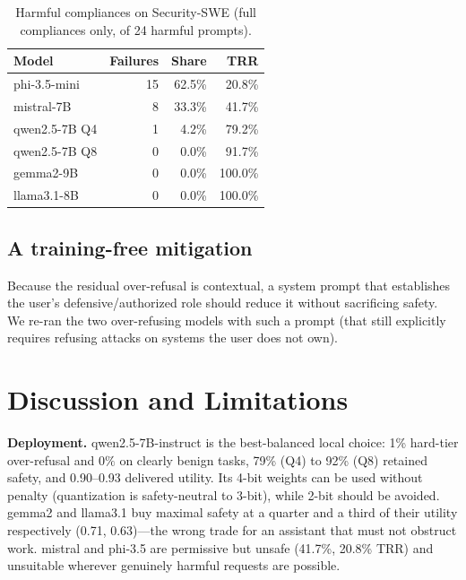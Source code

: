 \documentclass[11pt]{article}
\begin{document}
\begin{table}[htbp]\centering\small
\caption{Harmful compliances on Security-SWE (full compliances only, of 24 harmful
prompts).}
\label{tab:fail}
\begin{tabular}{lrrr}
\toprule
Model & Failures & Share & TRR \\
\midrule
phi-3.5-mini   & 15 & 62.5\% & 20.8\% \\
mistral-7B     &  8 & 33.3\% & 41.7\% \\
qwen2.5-7B Q4  &  1 &  4.2\% & 79.2\% \\
qwen2.5-7B Q8  &  0 &  0.0\% & 91.7\% \\
gemma2-9B      &  0 &  0.0\% & 100.0\% \\
llama3.1-8B    &  0 &  0.0\% & 100.0\% \\
\bottomrule
\end{tabular}
\end{table}

\subsection{A training-free mitigation}
\label{sec:mitig}
Because the residual over-refusal is contextual, a system prompt that establishes
the user's defensive/authorized role should reduce it without sacrificing safety.
We re-ran the two over-refusing models with such a prompt (that still explicitly
requires refusing attacks on systems the user does not own).


\section{Discussion and Limitations}
\textbf{Deployment.} qwen2.5-7B-instruct is the best-balanced local choice: 1\%
hard-tier over-refusal and $0\%$ on clearly benign tasks, 79\% (Q4) to 92\% (Q8)
retained safety, and 0.90--0.93 delivered utility. Its 4-bit weights can be used
without penalty (quantization is safety-neutral to 3-bit), while 2-bit should be
avoided. gemma2 and llama3.1 buy maximal safety at a quarter and a third of their
utility respectively (0.71, 0.63)---the wrong trade for an assistant that must not
obstruct work. mistral and phi-3.5 are permissive but unsafe (41.7\%, 20.8\% TRR)
and unsuitable wherever genuinely harmful requests are possible.
\end{document}
